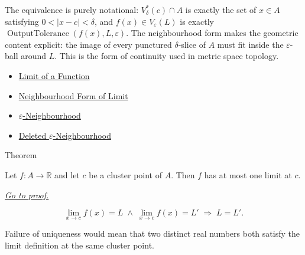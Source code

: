 \begin{remark*}[Interpretation]
The equivalence is purely notational: $V_\delta^*(c) \cap A$ is
exactly the set of $x \in A$ satisfying
$0<|x-c|<\delta$, and $f(x) \in
V_\varepsilon(L)$ is exactly $\operatorname{OutputTolerance}(f(x),L,
\varepsilon)$. The neighbourhood form makes the geometric content
explicit: the image of every punctured $\delta$-slice of $A$ must
fit inside the $\varepsilon$-ball around $L$. This is the form of
continuity used in metric space topology.
\end{remark*}

\begin{dependencies}
\begin{itemize}
  \item \hyperref[def:limit-function]{Limit of a Function}
  \item \hyperref[def:limit-function-neighbourhood]{Neighbourhood Form of Limit}
  \item \hyperref[def:epsilon-neighbourhood]{$\varepsilon$-Neighbourhood}
  \item \hyperref[def:deleted-epsilon-neighbourhood]{Deleted $\varepsilon$-Neighbourhood}
\end{itemize}
\end{dependencies}


\begin{theorembox}{Theorem}
\begin{theorem}
\label{thm:limit-unique}
Let $f : A \to \mathbb{R}$ and let $c$ be a cluster point of $A$.
Then $f$ has at most one limit at $c$.

\smallskip\noindent
\hyperref[prf:limit-unique]{\textit{Go to proof.}}
\end{theorem}
\end{theorembox}

\begin{remark*}
\[
  \lim_{x\to c}f(x)=L
  \;\wedge\;
  \lim_{x\to c}f(x)=L'
  \;\Rightarrow\; L = L'.
\]
\end{remark*}

\begin{remark*}
Failure of uniqueness would mean that two distinct real numbers both satisfy
the limit definition at the same cluster point.
\end{remark*}

